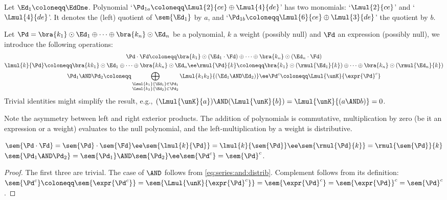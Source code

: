 \documentclass[a4paper,USenglish]{lipics}
\begin{document}
\begin{Example}\label{ex:e1}
  Let $\Ed_1 \coloneqq \EdOne$.  Polynomial
  `$\Pd_{1a} \coloneqq \Lmul{2}{ce} \oplus \Lmul{4}{de}$' has two monomials:
  `$\Lmul{2}{ce}$' and `$\Lmul{4}{de}$'.  It denotes the (left) quotient of
  $\sem{\Ed_1}$ by $a$, and
  `$\Pd_{1b} \coloneqq \Lmul{6}{ce} \oplus \Lmul{3}{de}$' the quotient by
  $b$.
\end{Example}

Let $\Pd = \bra{k_1} \odot \Ed_1 \oplus \cdots \oplus \bra{k_n} \odot \Ed_n$
be a polynomial, $k$ a weight (possibly null) and $\Fd$ an expression
(possibly null), we introduce the following operations:
\begin{gather}
\notag
  \Pd\cdot\Fd
  \coloneqq
    \bra{k_1} \odot (\Ed_1\cdot\Fd) \oplus \cdots \oplus \bra{k_n} \odot (\Ed_n\cdot\Fd)
  \\
  \notag
  \lmul{k}{\Pd}
   \coloneqq
    \bra{kk_1} \odot \Ed_1 \oplus \cdots \oplus \bra{kk_n} \odot \Ed_n
  \ee
  \rmul{\Pd}{k}
  \coloneqq
  \bra{k_1} \odot (\rmul{\Ed_1}{k}) \oplus \cdots \oplus \bra{k_n} \odot (\rmul{\Ed_n}{k})
  \\\label{eq:poly:ops:andcompl}
  \Pd_1 \AND \Pd_2
  \coloneqq
  \bigoplus_{{\substack{\Lmul{k_1}{\Ed_1} \in \Pd_1\\\Lmul{k_2}{\Ed_2} \in \Pd_2}}} \Lmul{k_1k_2}{(\Ed_1 \AND \Ed_2)}
  \ee
  \Pd^{c}
  \coloneqq
  \Lmul{\unK}{\expr{\Pd}^{c}}
\end{gather}
Trivial identities might simplify the result, e.g.,
$(\Lmul{\unK}{a}) \AND (\Lmul{\unK}{b}) = \Lmul{\unK}{(a \AND b)} = 0$.

Note the asymmetry between left and right exterior products.  The addition
of polynomials is commutative, multiplication by zero (be it an expression
or a weight) evaluates to the null polynomial, and the left-multiplication
by a weight is distributive.





\begin{Lemma}
  \label{lem:poly:ops}\begin{math}
\sem{\Pd\cdot\Fd} = \sem{\Pd} \cdot \sem{\Fd}
    \ee
    \sem{\lmul{k}{\Pd}} = \lmul{k}{\sem{\Pd}}
    \ee
    \sem{\rmul{\Pd}{k}} = \rmul{\sem{\Pd}}{k}
  \end{math}
  \\
  \begin{math}
\sem{\Pd_1 \AND \Pd_2} = \sem{\Pd_1} \AND \sem{\Pd_2}
    \ee
\sem{\Pd^{c}} = \sem{\Pd}^{c}
  \end{math}.
\end{Lemma}
\begin{proof}
  The first three are trivial.  The case of $\AND$ follows from
  \cref{eq:series:and:distrib}. Complement follows from its definition:
  $\sem{\Pd^c} \coloneqq \sem{\expr{\Pd^c}} =
  \sem{\Lmul{\unK}{\expr{\Pd}^{c}}} = \sem{\expr{\Pd}^{c}} =
  \sem{\expr{\Pd}}^{c} = \sem{\Pd}^c$.
\end{proof}
\end{document}

